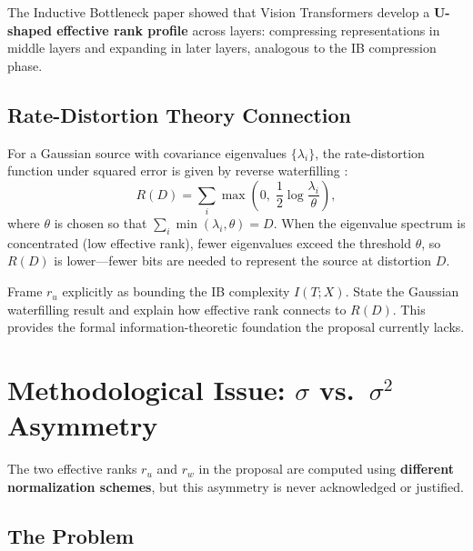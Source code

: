 \documentclass[11pt,a4paper]{article}
\begin{document}
The Inductive Bottleneck paper \cite{inductivebottleneck2025} showed that Vision Transformers develop a \textbf{U-shaped effective rank profile} across layers: compressing representations in middle layers and expanding in later layers, analogous to the IB compression phase.

\subsection{Rate-Distortion Theory Connection}

For a Gaussian source with covariance eigenvalues $\{\lambda_i\}$, the rate-distortion function under squared error is given by reverse waterfilling \cite{shannon1959coding, cover2006elements}:
\begin{equation}
    R(D) = \sum_{i} \max\!\left(0,\;\frac{1}{2}\log\frac{\lambda_i}{\theta}\right),
\end{equation}
where $\theta$ is chosen so that $\sum_i \min(\lambda_i, \theta) = D$. When the eigenvalue spectrum is concentrated (low effective rank), fewer eigenvalues exceed the threshold $\theta$, so $R(D)$ is lower---fewer bits are needed to represent the source at distortion $D$.

\begin{fixbox}
Frame $r_u$ explicitly as bounding the IB complexity $I(T;X)$. State the Gaussian waterfilling result and explain how effective rank connects to $R(D)$. This provides the formal information-theoretic foundation the proposal currently lacks.
\end{fixbox}

\section{Methodological Issue: $\sigma$ vs.\ $\sigma^2$ Asymmetry}

\begin{warningbox}
The two effective ranks $r_u$ and $r_w$ in the proposal are computed using \textbf{different normalization schemes}, but this asymmetry is never acknowledged or justified.
\end{warningbox}

\subsection{The Problem}
\end{document}
